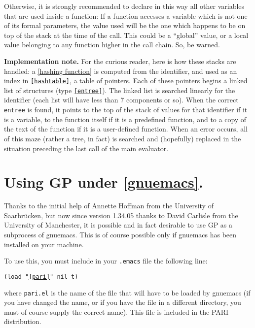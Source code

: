 Otherwise, it is strongly recommended to declare in this way all other variables that are used
inside a function: If a function accesses a variable which is not one of its
formal parameters, the value used will be the one which happens to be on top of
the stack at the time of the call. This could be a ``global'' value, or a local
value belonging to any function higher in the call chain. So, be warned.

{\bf Implementation note.} For the curious reader, here is how these stacks are
handled: a \ref{hashing function} is computed from the identifier, and used as an
index in {\tt \ref{hashtable}}, a table of pointers. Each of these pointers begins
a linked list of structures (type {\tt \ref{entree}}). The linked list is searched
linearly for the identifier (each list will have less than 7 components or
so). When the correct {\tt entree} is found, it points to the top of the
stack of values for that identifier if it is a variable, to the function
itself if it is a predefined function, and to a copy of the text of the
function if it is a user-defined function. When an error occurs, all of this
maze (rather a tree, in fact) is searched and (hopefully) replaced in the
situation preceding the last call of the main evaluator.

\section{Using GP under \ref{gnuemacs}.}

Thanks to the initial help of Annette Hoffman from the University of
Saarbr\"ucken, but now since version 1.34.05 thanks to David Carlisle
from the University of Manchester, it is possible and in fact desirable
to use GP as a subprocess of gnuemacs. This is of course possible only 
if gnuemacs has been installed on your machine.

To use this, you must include in your {\tt .emacs} file the following line:

{\tt (load "\ref{pari}" nil t)}

where {\tt pari.el} is the name of the file that will have to be loaded by gnuemacs
(if you have changed the name, or if you have the file in a different directory, you
must of course supply the correct name). This file is included in the PARI distribution.

